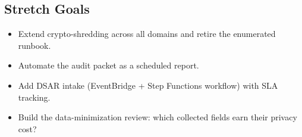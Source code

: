 \subsection*{Stretch Goals}
\begin{itemize}
    \item Extend crypto-shredding across all domains and retire the enumerated runbook.
    \item Automate the audit packet as a scheduled report.
    \item Add DSAR intake (EventBridge + Step Functions workflow) with SLA tracking.
    \item Build the data-minimization review: which collected fields earn their privacy cost?
\end{itemize}
